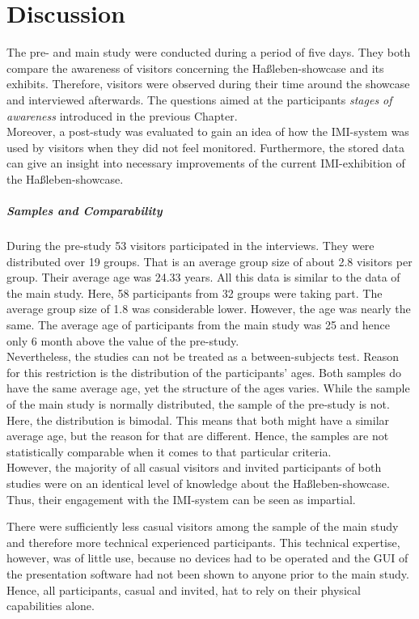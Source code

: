 \chapter{Discussion}
\label{discussion}

The pre- and main study were conducted during a period of five days. They both compare the awareness of visitors concerning the Haßleben-showcase and its exhibits. Therefore, visitors were observed during their time around the showcase and interviewed afterwards. The questions aimed at the participants \textit{stages of awareness} introduced in the previous Chapter.
\\
Moreover, a post-study was evaluated to gain an idea of how the \ac{IMI}-system was used by visitors when they did not feel monitored. Furthermore, the stored data can give an insight into necessary improvements of the current \ac{IMI}-exhibition of the Haßleben-showcase.

\paragraph{Samples and Comparability} During the pre-study 53 visitors participated in the interviews. They were distributed over 19 groups. That is an average group size of about 2.8 visitors per group. Their average age was 24.33 years. All this data is similar to the data of the main study. Here, 58 participants from 32 groups were taking part. The average group size of 1.8 was considerable lower. However, the age was nearly the same. The average age of participants from the main study was 25 and hence only 6 month above the value of the pre-study.
\\
Nevertheless, the studies can not be treated as a between-subjects test. Reason for this restriction is the distribution of the participants' ages. Both samples do have the same average age, yet the structure of the ages varies. While the sample of the main study is normally distributed, the sample of the pre-study is not. Here, the distribution is bimodal. This means that both might have a similar average age, but the reason for that are different. Hence, the samples are not statistically comparable when it comes to that particular criteria. 
\\
However, the majority of all casual visitors and invited participants of both studies were on an identical level of knowledge about the Haßleben-showcase. Thus, their engagement with the \ac{IMI}-system can be seen as impartial.

There were sufficiently less casual visitors among the sample of the main study and therefore more technical experienced participants. This technical expertise, however, was of little use, because no devices had to be operated and the \ac{GUI} of the presentation software had not been shown to anyone prior to the main study. Hence, all participants, casual and invited, hat to rely on their physical capabilities alone.


